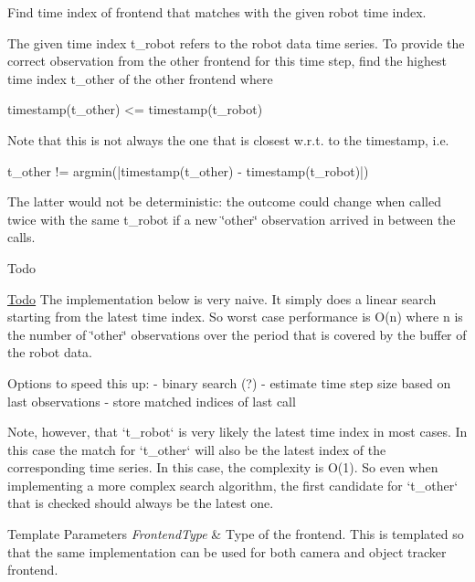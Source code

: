 Find time index of frontend that matches with the given robot time index. 

The given time index t\+\_\+robot refers to the robot data time series. To provide the correct observation from the other frontend for this time step, find the highest time index t\+\_\+other of the other frontend where \begin{DoxyVerb} timestamp(t_other) <= timestamp(t_robot)
\end{DoxyVerb}


Note that this is not always the one that is closest w.\+r.\+t. to the timestamp, i.\+e. \begin{DoxyVerb} t_other != argmin(|timestamp(t_other) - timestamp(t_robot)|)
\end{DoxyVerb}


The latter would not be deterministic\+: the outcome could change when called twice with the same {\ttfamily t\+\_\+robot} if a new \char`\"{}other\char`\"{} observation arrived in between the calls.

\begin{DoxyRefDesc}{Todo}
\item[\hyperlink{todo__todo000002}{Todo}]The implementation below is very naive. It simply does a linear search starting from the latest time index. So worst case performance is O(n) where n is the number of \char`\"{}other\char`\"{} observations over the period that is covered by the buffer of the robot data.\end{DoxyRefDesc}
\begin{DoxyVerb}  Options to speed this up:
   - binary search (?)
   - estimate time step size based on last observations
   - store matched indices of last call

  Note, however, that `t_robot` is very likely the latest time index
  in most cases.  In this case the match for `t_other` will also be
  the latest index of the corresponding time series.  In this case,
  the complexity is O(1).  So even when implementing a more complex
  search algorithm, the first candidate for `t_other` that is checked
  should always be the latest one.
\end{DoxyVerb}



\begin{DoxyTemplParams}{Template Parameters}
{\em Frontend\+Type} & Type of the frontend. This is templated so that the same implementation can be used for both camera and object tracker frontend. \\
\hline
\end{DoxyTemplParams}

